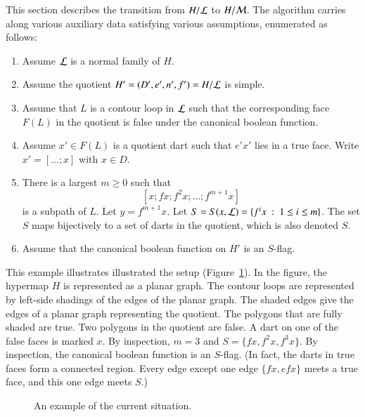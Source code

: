 This section describes the transition from $H/{\cal L}$ to $H/{\cal M}$.  The algorithm carries along various auxiliary data satisfying various assumptions, enumerated as follows:

\begin{remark}[context]\label{enum:context}
\begin{enumerate}
\item Assume $\cal L$ is a normal family of $H$.
\item Assume the quotient $H'=(D',e',n',f')=H/{\cal L}$ is simple.  
\item Assume that $L$ is a contour loop in ${\cal L}$ such that the corresponding face $F(L)$ in the quotient is false under the canonical boolean function.
\item Assume $x'\in F(L)$ is a quotient dart such that $e'x'$ lies in a true face.  Write $x' = [\ldots;x]$ with $x\in D$. 
\item There is a largest $m\ge0$ such that 
$$
[x;f x; f^2 x;\ldots;f^{m+1} x]
$$  
is a subpath of $L$.
Let $y = f^{m+1} x$.  Let $S = S(x,{\cal L}) = \{f^i x \mid 1 \le i\le m\}$.   The set $S$ maps bijectively to a set of darts in the quotient, which is also denoted  $S$. 
\item Assume that the canonical boolean function on $H'$ is an $S$-flag.
\end{enumerate}
\end{remark}

  


\begin{example}\label{ex:graph-gen}  This example illustrates illustrated the setup (Figure~\ref{fig:graph-gen}).   In the figure, the hypermap $H$ is represented as a planar graph.
The contour loops are represented by left-side shadings of the edges of the
planar graph.  The shaded edges give the edges of a planar graph representing the quotient.  The polygons that are fully shaded are true.   Two polygons in the quotient are false.  A dart on one of the false faces is marked $x$.  By inspection, $m=3$ and $S=\{f x,f^2 x,f^3 x\}$.  By inspection, the canonical boolean function is an $S$-flag.  (In fact, the darts in true faces form a connected region.  Every edge except one edge $\{f x, e f x\}$ meets a true face, and this one edge meets $S$.)
\end{example}

\begin{figure}[htb]
  \centering
  \caption{An example of the current situation.}
  \label{fig:graph-gen}
\end{figure}


